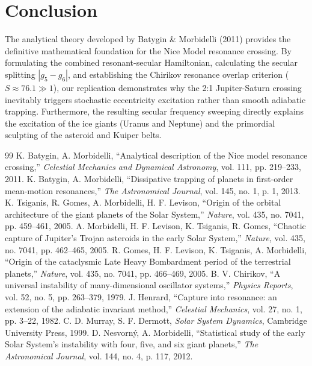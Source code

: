 \documentclass[11pt,a4paper]{article}
\begin{document}
\section{Conclusion}
The analytical theory developed by Batygin \& Morbidelli (2011) provides the definitive mathematical foundation for the Nice Model resonance crossing. By formulating the combined resonant-secular Hamiltonian, calculating the secular splitting $|g_5 - g_6|$, and establishing the Chirikov resonance overlap criterion ($S \approx 76.1 \gg 1$), our replication demonstrates why the 2:1 Jupiter-Saturn crossing inevitably triggers stochastic eccentricity excitation rather than smooth adiabatic trapping. Furthermore, the resulting secular frequency sweeping directly explains the excitation of the ice giants (Uranus and Neptune) and the primordial sculpting of the asteroid and Kuiper belts.

\begin{thebibliography}{99}
 K. Batygin, A. Morbidelli, ``Analytical description of the Nice model resonance crossing,'' \textit{Celestial Mechanics and Dynamical Astronomy}, vol. 111, pp. 219--233, 2011.
 K. Batygin, A. Morbidelli, ``Dissipative trapping of planets in first-order mean-motion resonances,'' \textit{The Astronomical Journal}, vol. 145, no. 1, p. 1, 2013.
 K. Tsiganis, R. Gomes, A. Morbidelli, H. F. Levison, ``Origin of the orbital architecture of the giant planets of the Solar System,'' \textit{Nature}, vol. 435, no. 7041, pp. 459--461, 2005.
 A. Morbidelli, H. F. Levison, K. Tsiganis, R. Gomes, ``Chaotic capture of Jupiter's Trojan asteroids in the early Solar System,'' \textit{Nature}, vol. 435, no. 7041, pp. 462--465, 2005.
 R. Gomes, H. F. Levison, K. Tsiganis, A. Morbidelli, ``Origin of the cataclysmic Late Heavy Bombardment period of the terrestrial planets,'' \textit{Nature}, vol. 435, no. 7041, pp. 466--469, 2005.
 B. V. Chirikov, ``A universal instability of many-dimensional oscillator systems,'' \textit{Physics Reports}, vol. 52, no. 5, pp. 263--379, 1979.
 J. Henrard, ``Capture into resonance: an extension of the adiabatic invariant method,'' \textit{Celestial Mechanics}, vol. 27, no. 1, pp. 3--22, 1982.
 C. D. Murray, S. F. Dermott, \textit{Solar System Dynamics}, Cambridge University Press, 1999.
 D. Nesvorn\'y, A. Morbidelli, ``Statistical study of the early Solar System's instability with four, five, and six giant planets,'' \textit{The Astronomical Journal}, vol. 144, no. 4, p. 117, 2012.
\end{thebibliography}
\end{document}
